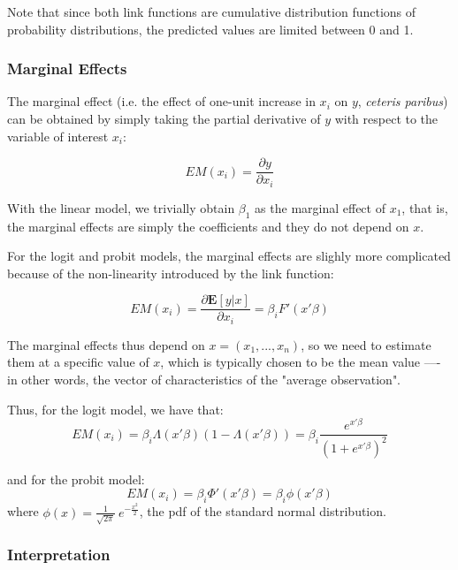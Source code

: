 Note that since both link functions are cumulative distribution functions of probability distributions, the predicted values are limited between 0 and 1.

\subsubsection{Marginal Effects}
The marginal effect (i.e. the effect of one-unit increase in $x_i$ on $y$, \textit{ceteris paribus}) can be obtained by simply taking the partial derivative of $y$ with respect to the variable of interest $x_i$:

\begin{equation}
    EM(x_i) = \frac{\partial y}{\partial x_i}
\end{equation}

With the linear model, we trivially obtain $\beta_1$ as the marginal effect of $x_1$, that is, the marginal effects are simply the coefficients and they do not depend on $x$.

For the logit and probit models, the marginal effects are slighly more complicated because of the non-linearity introduced by the link function:

\begin{equation}
    EM(x_i) = \frac{\partial \mathbf{E}[y|x]}{\partial x_i} = \beta_i F'(x'\beta)
\end{equation}

The marginal effects thus depend on $x = (x_1, ..., x_n)$, so we need to estimate them at a specific value of $x$, which is typically chosen to be the mean value ––- in other words, the vector of characteristics of the "average observation".

Thus, for the logit model, we have that:
$$
    EM(x_i) = \beta_i\Lambda(x'\beta)(1-\Lambda(x'\beta)) = \beta_i\frac{e^{x'\beta}}{(1+e^{x'\beta})^2}
$$

and for the probit model:
$$
    EM(x_i) = \beta_i\Phi'(x'\beta) = \beta_i\phi(x'\beta)
$$
where $\phi(x) = \frac{1}{\sqrt{2\pi}}\ e^{-\frac{x^2}{2}}$, the pdf of the standard normal distribution.

\subsubsection{Interpretation}

